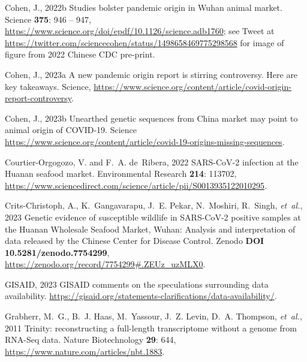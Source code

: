 \documentclass[9pt,twocolumn,twoside]{gsajnl_modified}
\begin{document}
{\begin{thebibliography}{44}
{Cohen, J.}, 2022{b} Studies bolster pandemic origin in {W}uhan animal market.
  Science {\bf 375}: 946 -- 947,
  \url{https://www.science.org/doi/epdf/10.1126/science.adb1760}; see Tweet at
  \url{https://twitter.com/sciencecohen/status/1498658469775298568} for image
  of figure from 2022 Chinese CDC pre-print.

{Cohen, J.}, 2023{a} {A new pandemic origin report is stirring controversy.
  Here are key takeaways}. Science,
  \url{https://www.science.org/content/article/covid-origin-report-controversy}.

{Cohen, J.}, 2023{b} {Unearthed genetic sequences from China market may point
  to animal origin of COVID-19}. Science
  \url{https://www.science.org/content/article/covid-19-origins-missing-sequences}.

{Courtier-Orgogozo, V. {\rm and} F.~A. de~Ribera}, 2022 {SARS-CoV-2 infection
  at the Huanan seafood market}. Environmental Research {\bf 214}: 113702,
  \url{https://www.sciencedirect.com/science/article/pii/S0013935122010295}.

{Crits-Christoph, A., K.~Gangavarapu, J.~E. Pekar, N.~Moshiri, R.~Singh, {\em
  et~al.\/}}, 2023 {Genetic evidence of susceptible wildlife in SARS-CoV-2
  positive samples at the Huanan Wholesale Seafood Market, Wuhan: Analysis and
  interpretation of data released by the Chinese Center for Disease Control}.
  Zenodo {\bf DOI 10.5281/zenodo.7754299},
  \url{https://zenodo.org/record/7754299#.ZEUz_uzMLX0}.

{GISAID}, 2023 {GISAID comments on the speculations surrounding data
  availability}.
  \url{https://gisaid.org/statements-clarifications/data-availability/}.

{Grabherr, M.~G., B.~J. Haas, M.~Yassour, J.~Z. Levin, D.~A. Thompson, {\em
  et~al.\/}}, 2011 Trinity: reconstructing a full-length transcriptome without
  a genome from {RNA-Seq} data. Nature Biotechnology {\bf 29}: 644,
  \url{https://www.nature.com/articles/nbt.1883}.


\end{thebibliography}}
\end{document}
